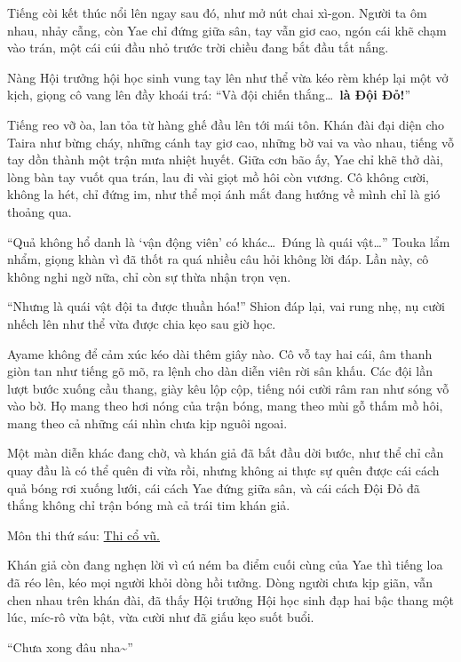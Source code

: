 \documentclass[../main.tex]{subfiles}
\begin{document}
Tiếng còi kết thúc nổi lên ngay sau đó, như mở nút chai xì-gon. Người ta ôm nhau, nhảy cẫng, còn Yae chỉ đứng giữa sân, tay vẫn giơ cao, ngón cái khẽ chạm vào trán, một cái cúi đầu nhỏ trước trời chiều đang bắt đầu tắt nắng.

Nàng Hội trưởng hội học sinh vung tay lên như thể vừa kéo rèm khép lại một vở kịch, giọng cô vang lên đầy khoái trá: ``Và đội chiến thắng\dots\ \textbf{là Đội Đỏ!}''

Tiếng reo vỡ òa, lan tỏa từ hàng ghế đầu lên tới mái tôn. Khán đài đại diện cho Taira như bừng cháy, những cánh tay giơ cao, những bờ vai va vào nhau, tiếng vỗ tay dồn thành một trận mưa nhiệt huyết. Giữa cơn bão ấy, Yae chỉ khẽ thở dài, lòng bàn tay vuốt qua trán, lau đi vài giọt mồ hôi còn vương. Cô không cười, không la hét, chỉ đứng im, như thể mọi ánh mắt đang hướng về mình chỉ là gió thoảng qua.

``Quả không hổ danh là `vận động viên' có khác\dots\ Đúng là quái vật\dots'' Touka lẩm nhẩm, giọng khàn vì đã thốt ra quá nhiều câu hỏi không lời đáp. Lần này, cô không nghi ngờ nữa, chỉ còn sự thừa nhận trọn vẹn.

``Nhưng là quái vật đội ta được thuần hóa!'' Shion đáp lại, vai rung nhẹ, nụ cười nhếch lên như thể vừa được chia kẹo sau giờ học.

Ayame không để cảm xúc kéo dài thêm giây nào. Cô vỗ tay hai cái, âm thanh giòn tan như tiếng gõ mõ, ra lệnh cho dàn diễn viên rời sân khấu. Các đội lần lượt bước xuống cầu thang, giày kêu lộp cộp, tiếng nói cười râm ran như sóng vỗ vào bờ. Họ mang theo hơi nóng của trận bóng, mang theo mùi gỗ thấm mồ hôi, mang theo cả những cái nhìn chưa kịp nguôi ngoai.

Một màn diễn khác đang chờ, và khán giả đã bắt đầu dời bước, như thể chỉ cần quay đầu là có thể quên đi vừa rồi, nhưng không ai thực sự quên được cái cách quả bóng rơi xuống lưới, cái cách Yae đứng giữa sân, và cái cách Đội Đỏ đã thắng không chỉ trận bóng mà cả trái tim khán giả.

\begin{center}
  {\color{vol} Môn thi thứ sáu: \uline{Thi cổ vũ.}}
\end{center}

Khán giả còn đang nghẹn lời vì cú ném ba điểm cuối cùng của Yae thì tiếng loa đã réo lên, kéo mọi người khỏi dòng hồi tưởng. Dòng người chưa kịp giãn, vẫn chen nhau trên khán đài, đã thấy Hội trưởng Hội học sinh đạp hai bậc thang một lúc, míc-rô vừa bật, vừa cười như đã giấu kẹo suốt buổi.

``Chưa xong đâu nha\~{}''
\end{document}
